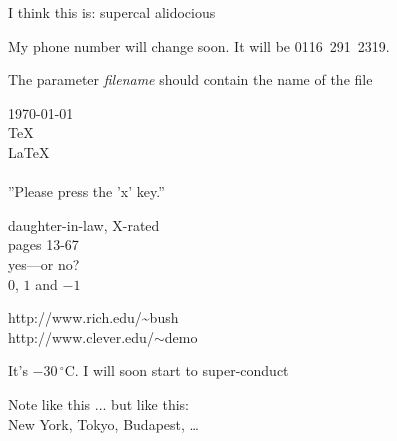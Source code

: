 \documentclass[a4paper, 11pt]{article}
\begin{document}

I think this is: su\-per\-cal\-%
al\-i\-do\-cious


My phone number will change soon.
It will be \mbox{0116 291 2319}.

The parameter 
\mbox{\emph{filename}} should
contain the name of the file



\today
\\

\TeX
\\

\LaTeX
\\

\LaTeXe
\\




''Please press the 'x' key.''




daughter-in-law, X-rated\\
pages 13-67\\
yes---or no?\\
$0$, $1$ and $-1$
\newline



http://www.rich.edu/\~{}bush \\
http://www.clever.edu/$\sim$demo
\newline




It's $-30\,^{\circ}\mathrm{C}$.
I will soon start to super-conduct
\newline






Note like this ... but like this: \\
New York, Tokyo, Budapest, \ldots
\newline
\end{document}
